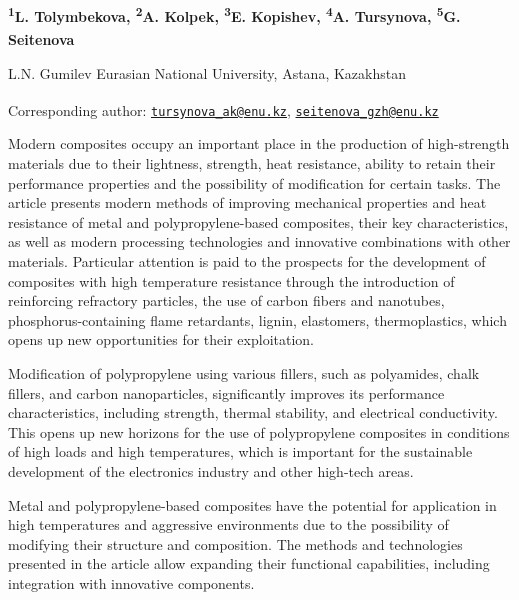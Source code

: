
\begin{articleheader}

{\bfseries
\textsuperscript{1}L. Tolymbekova,
\textsuperscript{2}A. Kolpek,
\textsuperscript{3}E. Kopishev,
\textsuperscript{4}A. Tursynova\textsuperscript{\envelope },
\textsuperscript{5}G. Seitenova\textsuperscript{\envelope }
}
\end{articleheader}

\begin{affiliation}
L.N. Gumilev Eurasian National University, Astana, Kazakhstan

\raggedright \textsuperscript{\envelope }Corresponding author:
\href{mailto:tursynova_ak@enu.kz}{\nolinkurl{tursynova\_ak@enu.kz}},
\href{mailto:seitenova_gzh@enu.kz}{\nolinkurl{seitenova\_gzh@enu.kz}}
\end{affiliation}

Modern composites occupy an important place in the production of
high-strength materials due to their lightness, strength, heat
resistance, ability to retain their performance properties and the
possibility of modification for certain tasks. The article presents
modern methods of improving mechanical properties and heat resistance of
metal and polypropylene-based composites, their key characteristics, as
well as modern processing technologies and innovative combinations with
other materials. Particular attention is paid to the prospects for the
development of composites with high temperature resistance through the
introduction of reinforcing refractory particles, the use of carbon
fibers and nanotubes, phosphorus-containing flame retardants, lignin,
elastomers, thermoplastics, which opens up new opportunities for their
exploitation.

Modification of polypropylene using various fillers, such as polyamides,
chalk fillers, and carbon nanoparticles, significantly improves its
performance characteristics, including strength, thermal stability, and
electrical conductivity. This opens up new horizons for the use of
polypropylene composites in conditions of high loads and high
temperatures, which is important for the sustainable development of the
electronics industry and other high-tech areas.

Metal and polypropylene-based composites have the potential for
application in high temperatures and aggressive environments due to the
possibility of modifying their structure and composition. The methods
and technologies presented in the article allow expanding their
functional capabilities, including integration with innovative
components.

